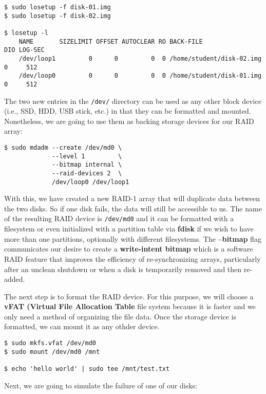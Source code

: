 \begin{lstlisting}[style=bashstyle]
$ sudo losetup -f disk-01.img
$ sudo losetup -f disk-02.img

$ losetup -l
    NAME       SIZELIMIT OFFSET AUTOCLEAR RO BACK-FILE                 DIO LOG-SEC
    /dev/loop1         0      0         0  0 /home/student/disk-02.img   0     512
    /dev/loop0         0      0         0  0 /home/student/disk-01.img   0     512
\end{lstlisting}

The two new entries in the \texttt{/dev/} directory can be used as any other
block device (i.e., SSD, HDD, USB stick, etc.) in that they can be formatted and
mounted. Nonetheless, we are going to use them as backing storage devices for
our RAID array:

\begin{lstlisting}[style=bashstyle]
$ sudo mdadm --create /dev/md0 \
             --level 1         \
             --bitmap internal \
             --raid-devices 2  \
             /dev/loop0 /dev/loop1
\end{lstlisting}

With this, we have created a new RAID-1 array that will duplicate data between
the two disks. So if one disk fails, the data will still be accessible to us.
The name of the resulting RAID device is \texttt{/dev/md0} and it can be
formatted with a filesystem or even initialized with a partition table via
\textbf{fdisk} if we wish to have more than one partitions, optionally with
different filesystems. The \textbf{--bitmap} flag communicates our desire to
create a \textbf{write-intent bitmap} which is a software RAID feature that
improves the efficiency of re-synchronizing arrays, particularly after an
unclean shutdown or when a disk is temporarily removed and then re-added.

The next step is to format the RAID device. For this purpose, we will choose
a \textbf{vFAT (Virtual File Allocation Table} file system because it is faster
and we only need a method of organizing the file data. Once the storage device
is formatted, we can mount it as any othder device.

\begin{lstlisting}[style=bashstyle]
$ sudo mkfs.vfat /dev/md0
$ sudo mount /dev/md0 /mnt

$ echo 'hello world' | sudo tee /mnt/test.txt
\end{lstlisting}

Next, we are going to simulate the failure of one of our disks:

